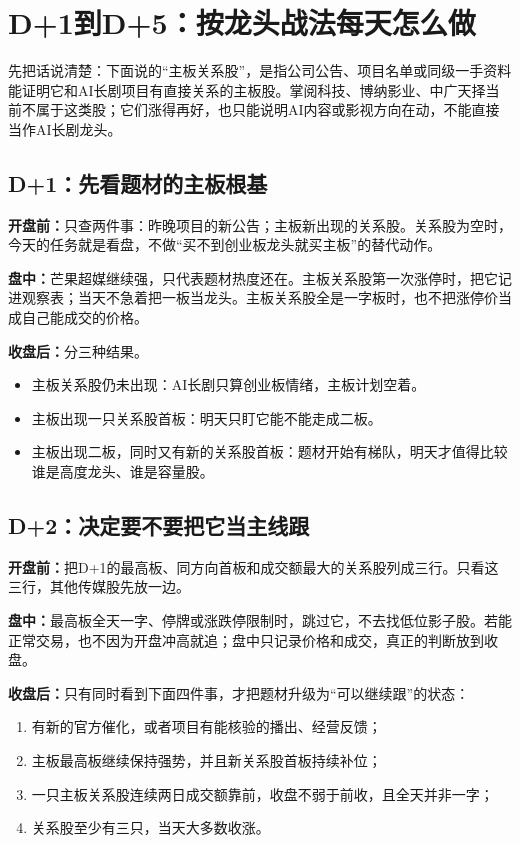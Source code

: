 \section{D+1到D+5：按龙头战法每天怎么做}

先把话说清楚：下面说的“主板关系股”，是指公司公告、项目名单或同级一手资料能证明它和AI长剧项目有直接关系的主板股。掌阅科技、博纳影业、中广天择当前不属于这类股；它们涨得再好，也只能说明AI内容或影视方向在动，不能直接当作AI长剧龙头。

\subsection*{D+1：先看题材的主板根基}

\textbf{开盘前：}只查两件事：昨晚项目的新公告；主板新出现的关系股。关系股为空时，今天的任务就是看盘，不做“买不到创业板龙头就买主板”的替代动作。

\textbf{盘中：}芒果超媒继续强，只代表题材热度还在。主板关系股第一次涨停时，把它记进观察表；当天不急着把一板当龙头。主板关系股全是一字板时，也不把涨停价当成自己能成交的价格。

\textbf{收盘后：}分三种结果。

\begin{itemize}
  \item 主板关系股仍未出现：AI长剧只算创业板情绪，主板计划空着。
  \item 主板出现一只关系股首板：明天只盯它能不能走成二板。
  \item 主板出现二板，同时又有新的关系股首板：题材开始有梯队，明天才值得比较谁是高度龙头、谁是容量股。
\end{itemize}

\subsection*{D+2：决定要不要把它当主线跟}

\textbf{开盘前：}把D+1的最高板、同方向首板和成交额最大的关系股列成三行。只看这三行，其他传媒股先放一边。

\textbf{盘中：}最高板全天一字、停牌或涨跌停限制时，跳过它，不去找低位影子股。若能正常交易，也不因为开盘冲高就追；盘中只记录价格和成交，真正的判断放到收盘。

\textbf{收盘后：}只有同时看到下面四件事，才把题材升级为“可以继续跟”的状态：

\begin{enumerate}
  \item 有新的官方催化，或者项目有能核验的播出、经营反馈；
  \item 主板最高板继续保持强势，并且新关系股首板持续补位；
  \item 一只主板关系股连续两日成交额靠前，收盘不弱于前收，且全天并非一字；
  \item 关系股至少有三只，当天大多数收涨。
\end{enumerate}

